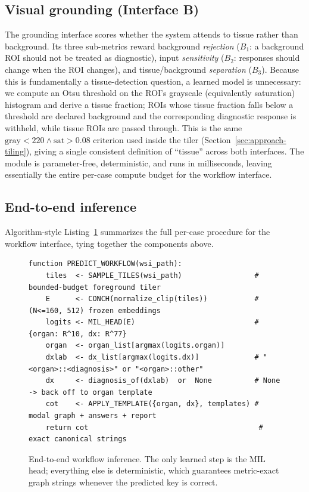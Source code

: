 \documentclass[11pt,a4paper]{article}
\begin{document}
\subsection{Visual grounding (Interface B)}
\label{sec:approach-grounding}
The grounding interface scores whether the system attends to tissue rather than background. Its
three sub-metrics reward background \emph{rejection} ($B_1$: a background ROI should not be
treated as diagnostic), input \emph{sensitivity} ($B_2$: responses should change when the ROI
changes), and tissue/background \emph{separation} ($B_3$). Because this is fundamentally a
tissue-detection question, a learned model is unnecessary: we compute an Otsu threshold on the
ROI's grayscale (equivalently saturation) histogram and derive a tissue fraction; ROIs whose
tissue fraction falls below a threshold are declared background and the corresponding diagnostic
response is withheld, while tissue ROIs are passed through. This is the same
$\text{gray}<220 \wedge \text{sat}>0.08$ criterion used inside the tiler
(Section~\ref{sec:approach-tiling}), giving a single consistent definition of ``tissue'' across
both interfaces. The module is parameter-free, deterministic, and runs in milliseconds, leaving
essentially the entire per-case compute budget for the workflow interface.

\subsection{End-to-end inference}
Algorithm-style Listing~\ref{lst:infer} summarizes the full per-case procedure for the workflow
interface, tying together the components above.

\begin{figure}[h]
\begin{footnotesize}
\begin{verbatim}
function PREDICT_WORKFLOW(wsi_path):
    tiles  <- SAMPLE_TILES(wsi_path)                 # bounded-budget foreground tiler
    E      <- CONCH(normalize_clip(tiles))           # (N<=160, 512) frozen embeddings
    logits <- MIL_HEAD(E)                            # {organ: R^10, dx: R^77}
    organ  <- organ_list[argmax(logits.organ)]
    dxlab  <- dx_list[argmax(logits.dx)]             # "<organ>::<diagnosis>" or "<organ>::other"
    dx     <- diagnosis_of(dxlab)  or  None          # None -> back off to organ template
    cot    <- APPLY_TEMPLATE({organ, dx}, templates) # modal graph + answers + report
    return cot                                        # exact canonical strings
\end{verbatim}
\end{footnotesize}
\caption{End-to-end workflow inference. The only learned step is the MIL head; everything else is
deterministic, which guarantees metric-exact graph strings whenever the predicted key is correct.}
\label{lst:infer}
\end{figure}
\end{document}
